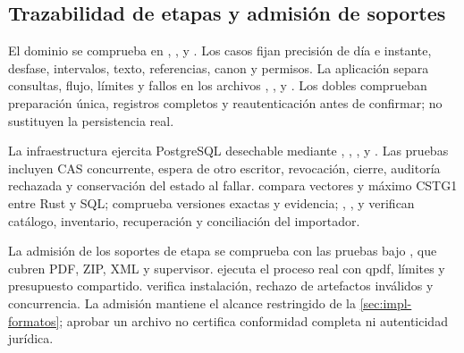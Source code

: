 \subsection{Trazabilidad de etapas y admisión de soportes}\label{sec:matriz-etapas}

{\raggedright El dominio se comprueba en , ,  y . Los casos fijan precisión de día e instante, desfase, intervalos, texto, referencias, canon y permisos. La aplicación separa consultas, flujo, límites y fallos en los archivos , ,  y . Los dobles comprueban preparación única, registros completos y reautenticación antes de confirmar; no sustituyen la persistencia real.\par}

{\raggedright La infraestructura ejercita PostgreSQL desechable mediante , , ,  y . Las pruebas incluyen CAS concurrente, espera de otro escritor, revocación, cierre, auditoría rechazada y conservación del estado al fallar.  compara vectores y máximo CSTG1 entre Rust y SQL;  comprueba versiones exactas y evidencia; , ,  y  verifican catálogo, inventario, recuperación y conciliación del importador.\par}

{\raggedright La admisión de los soportes de etapa se comprueba con las pruebas bajo , que cubren PDF, ZIP, XML y supervisor.  ejecuta el proceso real con qpdf, límites y presupuesto compartido.  verifica instalación, rechazo de artefactos inválidos y concurrencia. La admisión mantiene el alcance restringido de la \cref{sec:impl-formatos}; aprobar un archivo no certifica conformidad completa ni autenticidad jurídica.\par}

